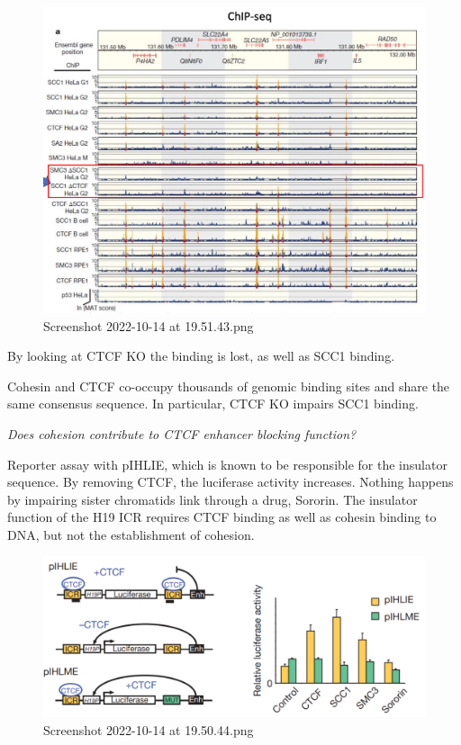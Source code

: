 \begin{figure}
\centering
\includegraphics[width=\textwidth]{../_resources/Screenshot_2022-10-14_at_19-51-43.png}
\caption{Screenshot 2022-10-14 at 19.51.43.png}
\end{figure}

By looking at CTCF KO the binding is lost, as well as SCC1 binding.

Cohesin and CTCF co-occupy thousands of genomic binding sites and share the same consensus sequence. In particular, CTCF KO impairs SCC1 binding.

\emph{Does cohesion contribute to CTCF enhancer blocking function?}

Reporter assay with pIHLIE, which is known to be responsible for the insulator sequence. By removing CTCF, the luciferase activity increases. Nothing happens by impairing sister chromatids link through a drug, Sororin. The insulator function of the H19 ICR requires CTCF binding as well as cohesin binding to DNA, but not the establishment of cohesion.

\begin{figure}
\centering
\includegraphics[width=\textwidth]{../_resources/Screenshot_2022-10-14_at_19-50-44.png}
\caption{Screenshot 2022-10-14 at 19.50.44.png}
\end{figure}

